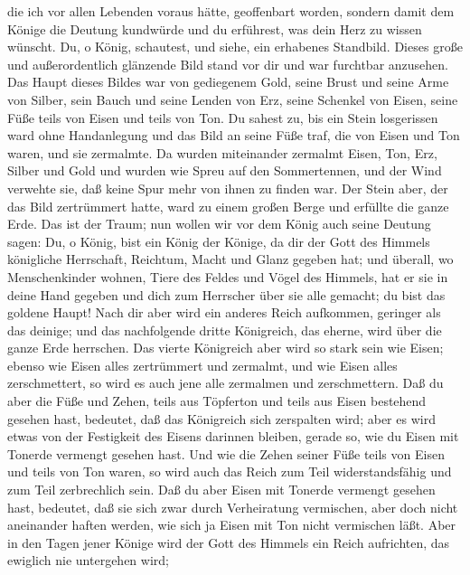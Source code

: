 die ich vor allen Lebenden voraus hätte, geoffenbart worden, sondern
damit dem Könige die Deutung kundwürde und du erführest, was dein Herz
zu wissen wünscht.  Du, o König, schautest, und siehe,
ein erhabenes Standbild. Dieses große und außerordentlich glänzende Bild
stand vor dir und war furchtbar anzusehen.  Das Haupt
dieses Bildes war von gediegenem Gold, seine Brust und seine Arme von
Silber, sein Bauch und seine Lenden von Erz,  seine
Schenkel von Eisen, seine Füße teils von Eisen und teils von Ton.
 Du sahest zu, bis ein Stein losgerissen ward ohne
Handanlegung und das Bild an seine Füße traf, die von Eisen und Ton
waren, und sie zermalmte.  Da wurden miteinander zermalmt
Eisen, Ton, Erz, Silber und Gold und wurden wie Spreu auf den
Sommertennen, und der Wind verwehte sie, daß keine Spur mehr von ihnen
zu finden war. Der Stein aber, der das Bild zertrümmert hatte, ward zu
einem großen Berge und erfüllte die ganze Erde.  Das ist
der Traum; nun wollen wir vor dem König auch seine Deutung sagen:
 Du, o König, bist ein König der Könige, da dir der Gott
des Himmels königliche Herrschaft, Reichtum, Macht und Glanz gegeben
hat;  und überall, wo Menschenkinder wohnen, Tiere des
Feldes und Vögel des Himmels, hat er sie in deine Hand gegeben und dich
zum Herrscher über sie alle gemacht; du bist das goldene Haupt!
 Nach dir aber wird ein anderes Reich aufkommen, geringer
als das deinige; und das nachfolgende dritte Königreich, das eherne,
wird über die ganze Erde herrschen.  Das vierte
Königreich aber wird so stark sein wie Eisen; ebenso wie Eisen alles
zertrümmert und zermalmt, und wie Eisen alles zerschmettert, so wird es
auch jene alle zermalmen und zerschmettern.  Daß du aber
die Füße und Zehen, teils aus Töpferton und teils aus Eisen bestehend
gesehen hast, bedeutet, daß das Königreich sich zerspalten wird; aber es
wird etwas von der Festigkeit des Eisens darinnen bleiben, gerade so,
wie du Eisen mit Tonerde vermengt gesehen hast.  Und wie
die Zehen seiner Füße teils von Eisen und teils von Ton waren, so wird
auch das Reich zum Teil widerstandsfähig und zum Teil zerbrechlich sein.
 Daß du aber Eisen mit Tonerde vermengt gesehen hast,
bedeutet, daß sie sich zwar durch Verheiratung vermischen, aber doch
nicht aneinander haften werden, wie sich ja Eisen mit Ton nicht
vermischen läßt.  Aber in den Tagen jener Könige wird der
Gott des Himmels ein Reich aufrichten, das ewiglich nie untergehen wird;
